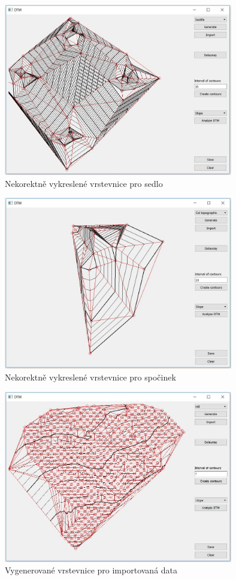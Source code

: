 \documentclass[a4paper, 12pt]{article}
\begin{document}
\begin{figure}[h!]
\centering
\includegraphics[width=10cm]{pictures/saddle_bad.jpg}
\caption{Nekorektně vykreslené vrstevnice pro sedlo}
\end{figure}

\begin{figure}[h!]
\centering
\includegraphics[width=10cm]{pictures/spocinek_nicmoc.jpg}
\caption{Nekorektně vykreslené vrstevnice pro spočinek}
\end{figure}

\begin{figure}[h!]
\centering
\includegraphics[width=10cm]{pictures/imported.jpg}
\caption{Vygenerované vrstevnice pro importovaná data}
\end{figure}
\end{document}
